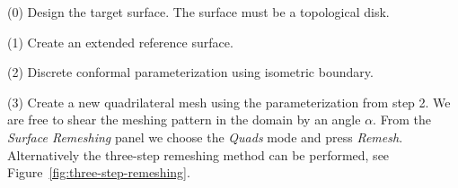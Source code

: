 \documentclass[Thesis.tex]{subfiles}
\begin{document}
\begin{compactenum}[(1)]

\item[(0)] Design the target surface. The surface must be a topological disk. 
\item[(1)] Create an extended reference surface.

\begin{center}
\begin{minipage}{0.9\linewidth}
            \centering
\end{minipage}
\end{center}    

\item[(2)] Discrete conformal parameterization using isometric boundary. 

\begin{center}
\begin{minipage}{0.9\linewidth}
            \centering
\end{minipage}
\end{center}    

\item[(3)] Create a new quadrilateral mesh using the parameterization from step 2. We are free to shear the meshing pattern in the domain by an angle $\alpha$. From the \emph{Surface Remeshing} panel we choose the \emph{Quads} mode and press \emph{Remesh}. Alternatively the three-step remeshing method can be performed, see Figure~\ref{fig:three-step-remeshing}.

\begin{center}
\begin{minipage}{0.9\linewidth}
            \centering
\end{minipage}
\end{center}   


\end{compactenum}
\end{document}
